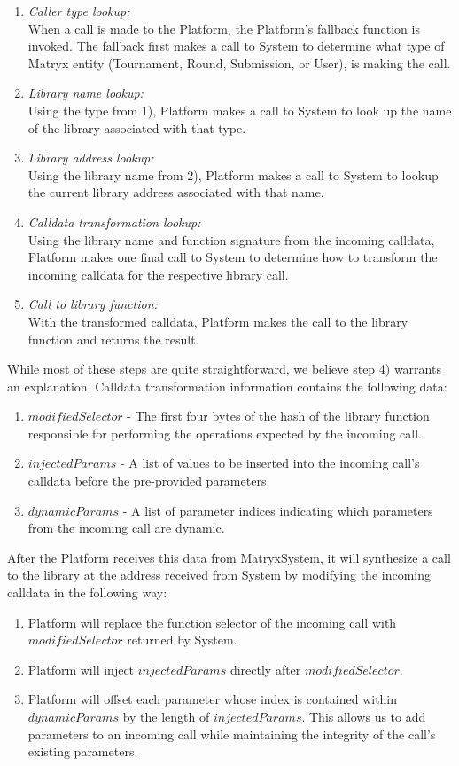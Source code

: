 \documentclass[a4paper, 10pt, conference]{ieeeconf}      %
\begin{document}
\begin{enumerate}
    \item \textit{Caller type lookup:} \\ When a call is made to the Platform, the Platform’s fallback function is invoked. The fallback first makes a call to System to determine what type of Matryx entity (Tournament, Round, Submission, or User), is making the call.
    \item \textit{Library name lookup:} \\ Using the type from 1), Platform makes a call to System to look up the name of the library associated with that type.
    \item \textit{Library address lookup:} \\ Using the library name from 2), Platform makes a call to System to lookup the current library address associated with that name.
    \item \textit{Calldata transformation lookup:} \\ Using the library name and function signature from the incoming calldata, Platform makes one final call to System to determine how to transform the incoming calldata for the respective library call.
    \item \textit{Call to library function:} \\ With the transformed calldata, Platform makes the call to the library function and returns the result.
\end{enumerate}
\bigskip

While most of these steps are quite straightforward, we believe step 4) warrants an explanation. Calldata transformation information contains the following data:

\begin{enumerate}
\item $modifiedSelector$ - The first four bytes of the hash of the library function responsible for performing the operations expected by the incoming call.
\item $injectedParams$ - A list of values to be inserted into the incoming call's calldata before the pre-provided parameters.
\item $dynamicParams$ - A list of parameter indices indicating which parameters from the incoming call are dynamic.
\end{enumerate}

After the Platform receives this data from MatryxSystem, it will synthesize a call to the library at the address received from System by modifying the incoming calldata in the following way:
\begin{enumerate}
\item Platform will replace the function selector of the incoming call with $modifiedSelector$ returned by System.
\item Platform will inject $injectedParams$ directly after $modifiedSelector$.
\item Platform will offset each parameter whose index is contained within $dynamicParams$ by the length of $injectedParams$. This allows us to add parameters to an incoming call while maintaining the integrity of the call's existing parameters.
\end{enumerate}
\end{document}
